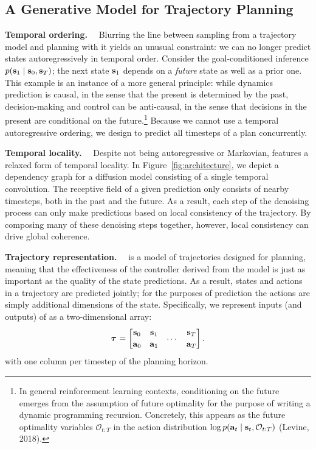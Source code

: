 \subsection{A Generative Model for Trajectory Planning}
\label{sec:model}

\textbf{Temporal ordering.}~~
Blurring the line between sampling from a trajectory model and planning with it yields an unusual constraint: we can no longer predict states autoregressively in temporal order.
Consider the goal-conditioned inference ${p(\mathbf{s}_1 \mid \mathbf{s}_0, \mathbf{s}_T)}$;
the next state $\mathbf{s}_1$ depends on a \emph{future} state as well as a prior one.
This example is an instance of a more general principle:
while dynamics prediction is causal, in the sense that the present is determined by the past, decision-making and control can be anti-causal, in the sense that decisions in the present are conditional on the future.\footnote{
    In general reinforcement learning contexts, conditioning on the future emerges from the assumption of future optimality for the purpose of writing a dynamic programming recursion. Concretely, this appears as the future optimality variables $\mathcal{O}_{t:T}$ in the action distribution $\log p(\mathbf{a}_t \mid \mathbf{s}_t, \mathcal{O}_{t:T})$ (Levine, 2018)\nocite{levine2018reinforcement}.
}
Because we cannot use a temporal autoregressive ordering, we design \method to predict all timesteps of a plan concurrently.

\textbf{Temporal locality.}~~
Despite not being autoregressive or Markovian, \method features a relaxed form of temporal locality.
In Figure~\ref{fig:architecture}, we depict a dependency graph for a diffusion model consisting of a single temporal convolution.
The receptive field of a given prediction only consists of nearby timesteps, both in the past and the future.
As a result, each step of the denoising process can only make predictions based on local consistency of the trajectory.
By composing many of these denoising steps together, however, local consistency can drive global coherence.

\textbf{Trajectory representation.}~~
\method is a model of trajectories designed for planning, meaning that the effectiveness of the controller derived from the model is just as important as the quality of the state predictions.
As a result, states and actions in a trajectory are predicted jointly; for the purposes of prediction the actions are simply additional dimensions of the state.
Specifically, we represent inputs (and outputs) of \method as a two-dimensional array:
\vspace{-.1cm}
\begin{align}
\label{eq:trajectory_array}
\btau{} = \begin{bmatrix}
    \bs_{0} & \bs_{1} & \raisebox{-.2cm}{\ldots} & \bs_{T} \\
    \ba_{0} & \ba_{1} & & \ba_{T}
\end{bmatrix}.
\end{align}
with one column per timestep of the planning horizon.

